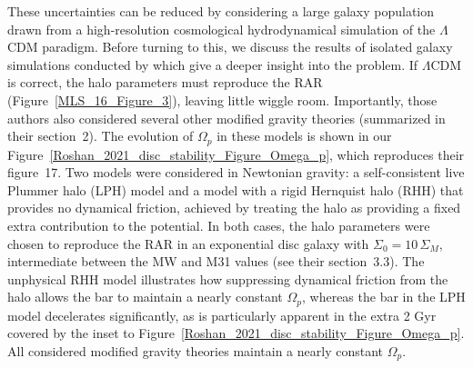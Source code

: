 \documentclass[fleqn,usenatbib,useAMS,onecolumn]{mnras} %
\begin{document}
These uncertainties can be reduced by considering a large galaxy population drawn from a high-resolution cosmological hydrodynamical simulation of the $\Lambda$CDM paradigm. Before turning to this, we discuss the results of isolated galaxy simulations conducted by \citet{Roshan_2021_disc_stability} which give a deeper insight into the problem. If $\Lambda$CDM is correct, the halo parameters must reproduce the RAR (Figure~\ref{MLS_16_Figure_3}), leaving little wiggle room. Importantly, those authors also considered several other modified gravity theories (summarized in their section~2). The evolution of $\Omega_p$ in these models is shown in our Figure~\ref{Roshan_2021_disc_stability_Figure_Omega_p}, which reproduces their figure~17. Two models were considered in Newtonian gravity: a self-consistent live Plummer halo (LPH) model and a model with a rigid Hernquist halo (RHH) that provides no dynamical friction, achieved by treating the halo as providing a fixed extra contribution to the potential. In both cases, the halo parameters were chosen to reproduce the RAR in an exponential disc galaxy with $\Sigma_0 = 10 \, \Sigma_M$, intermediate between the MW and M31 values (see their section~3.3). The unphysical RHH model illustrates how suppressing dynamical friction from the halo allows the bar to maintain a nearly constant $\Omega_p$, whereas the bar in the LPH model decelerates significantly, as is particularly apparent in the extra 2 Gyr covered by the inset to Figure~\ref{Roshan_2021_disc_stability_Figure_Omega_p}. All considered modified gravity theories maintain a nearly constant $\Omega_p$.
\end{document}
